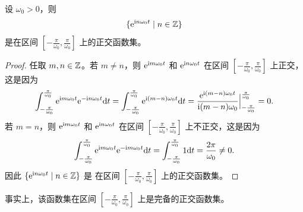 \begin{example}[指数函数集]
    设 $\omega_0 > 0$，则
    \begin{align*}
        \{\mathrm{e}^{\mathrm{i} n\omega_0t} \mid n \in \mathbb{Z}\}
    \end{align*}
    是在区间 $[-\frac{\pi}{\omega_0}, \frac{\pi}{\omega_0}]$ 上的正交函数集。
\end{example}

\begin{proof}
    任取 $m, n \in \mathbb{Z}$。若 $m \neq n$，则 $\mathrm{e}^{\mathrm{i} m\omega_0t}$ 和 $\mathrm{e}^{\mathrm{i} n\omega_0t}$
    在区间 $[-\frac{\pi}{\omega_0}, \frac{\pi}{\omega_0}]$ 上正交，这是因为
    \begin{align*}
        \int_{-\frac{\pi}{\omega_0}}^{\frac{\pi}{\omega_0}}\mathrm{e}^{\mathrm{i} m\omega_0t}\mathrm{e}^{-\mathrm{i} n\omega_0t}\mathrm{d}t
        = \int_{-\frac{\pi}{\omega_0}}^{\frac{\pi}{\omega_0}}\mathrm{e}^{\mathrm{i} (m - n)\omega_0t}\mathrm{d}t
        = \frac{\mathrm{e}^{\mathrm{i} (m - n)\omega_0t}}{\mathrm{i} (m - n)\omega_0}\Big|_{-\frac{\pi}{\omega_0}}^{\frac{\pi}{\omega_0}}
        = 0.
    \end{align*}
    若 $m = n$，则 $\mathrm{e}^{\mathrm{i} m\omega_0t}$ 和 $\mathrm{e}^{\mathrm{i} n\omega_0t}$
    在区间 $[-\frac{\pi}{\omega_0}, \frac{\pi}{\omega_0}]$ 上不正交，这是因为
    \begin{align*}
        \int_{-\frac{\pi}{\omega_0}}^{\frac{\pi}{\omega_0}}\mathrm{e}^{\mathrm{i} m\omega_0t}\mathrm{e}^{-\mathrm{i} m\omega_0t}\mathrm{d}t
        = \int_{-\frac{\pi}{\omega_0}}^{\frac{\pi}{\omega_0}}1\mathrm{d}t
        = \frac{2\pi}{\omega_0} \neq 0.
    \end{align*}
    因此 $\{\mathrm{e}^{\mathrm{i} n\omega_0t} \mid n \in \mathbb{Z}\}$ 是
    在区间 $[-\frac{\pi}{\omega_0}, \frac{\pi}{\omega_0}]$ 上的正交函数集。
\end{proof}

\begin{remark}
    事实上，该函数集在区间 $[-\frac{\pi}{\omega_0}, \frac{\pi}{\omega_0}]$ 上是完备的正交函数集。
\end{remark}


